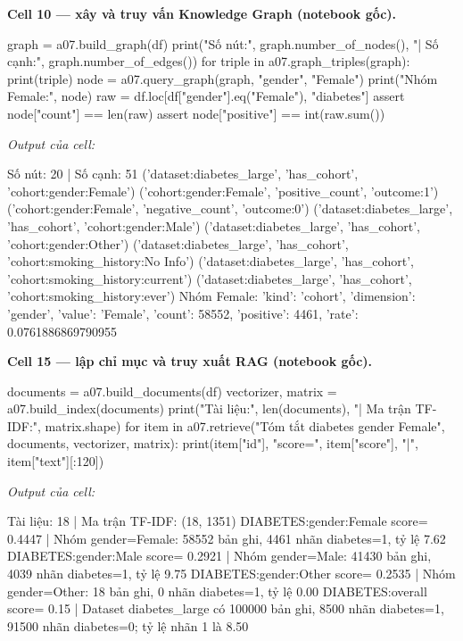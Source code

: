 \documentclass[12pt,a4paper]{report}
\begin{document}
\par\medskip\noindent\textbf{Cell 10 --- xây và truy vấn Knowledge Graph (notebook gốc).}
\begin{NotebookCode}
graph = a07.build_graph(df)
print("Số nút:", graph.number_of_nodes(), "| Số cạnh:", graph.number_of_edges())
for triple in a07.graph_triples(graph): print(triple)
node = a07.query_graph(graph, "gender", "Female")
print("Nhóm Female:", node)
raw = df.loc[df["gender"].eq("Female"), "diabetes"]
assert node["count"] == len(raw)
assert node["positive"] == int(raw.sum())
\end{NotebookCode}
\noindent\textit{Output của cell:}
\begin{NotebookOutput}
Số nút: 20 | Số cạnh: 51
('dataset:diabetes_large', 'has_cohort', 'cohort:gender:Female')
('cohort:gender:Female', 'positive_count', 'outcome:1')
('cohort:gender:Female', 'negative_count', 'outcome:0')
('dataset:diabetes_large', 'has_cohort', 'cohort:gender:Male')
('dataset:diabetes_large', 'has_cohort', 'cohort:gender:Other')
('dataset:diabetes_large', 'has_cohort', 'cohort:smoking_history:No Info')
('dataset:diabetes_large', 'has_cohort', 'cohort:smoking_history:current')
('dataset:diabetes_large', 'has_cohort', 'cohort:smoking_history:ever')
Nhóm Female: {'kind': 'cohort', 'dimension': 'gender', 'value': 'Female', 'count': 58552, 'positive': 4461, 'rate': 0.0761886869790955}
\end{NotebookOutput}

\par\medskip\noindent\textbf{Cell 15 --- lập chỉ mục và truy xuất RAG (notebook gốc).}
\begin{NotebookCode}
documents = a07.build_documents(df)
vectorizer, matrix = a07.build_index(documents)
print("Tài liệu:", len(documents), "| Ma trận TF-IDF:", matrix.shape)
for item in a07.retrieve("Tóm tắt diabetes gender Female", documents, vectorizer, matrix):
    print(item["id"], "score=", item["score"], "|", item["text"][:120])
\end{NotebookCode}
\noindent\textit{Output của cell:}
\begin{NotebookOutput}
Tài liệu: 18 | Ma trận TF-IDF: (18, 1351)
DIABETES:gender:Female score= 0.4447 | Nhóm gender=Female: 58552 bản ghi, 4461 nhãn diabetes=1, tỷ lệ 7.62%
DIABETES:gender:Male score= 0.2921 | Nhóm gender=Male: 41430 bản ghi, 4039 nhãn diabetes=1, tỷ lệ 9.75%
DIABETES:gender:Other score= 0.2535 | Nhóm gender=Other: 18 bản ghi, 0 nhãn diabetes=1, tỷ lệ 0.00%
DIABETES:overall score= 0.15 | Dataset diabetes_large có 100000 bản ghi, 8500 nhãn diabetes=1, 91500 nhãn diabetes=0; tỷ lệ nhãn 1 là 8.50%
\end{NotebookOutput}
\end{document}
